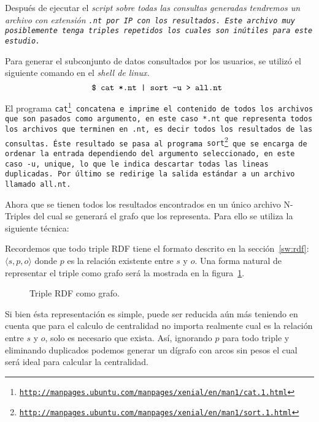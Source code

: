 Después de ejecutar el \it{script} sobre todas las consultas generadas tendremos
un archivo con extensión \tt{.nt} por IP con los resultados.
Este archivo muy posiblemente tenga triples repetidos los cuales son inútiles
para este estudio.

Para generar el subconjunto de datos consultados por los usuarios, se utilizó el
siguiente comando en el \it{shell} de \it{linux}.
$$\tt{\$ cat *.nt | sort -u > all.nt }$$

El programa \tt{cat}\footnote{
  \url{http://manpages.ubuntu.com/manpages/xenial/en/man1/cat.1.html}} 
concatena e imprime el contenido de todos los archivos que
son pasados como argumento, en este caso \tt{*.nt} que representa todos los
archivos que terminen en \tt{.nt}, es decir todos los resultados de las
consultas.
Éste resultado se pasa al programa \tt{sort}\footnote{
  \url{http://manpages.ubuntu.com/manpages/xenial/en/man1/sort.1.html}}
que se encarga de ordenar la entrada dependiendo del argumento seleccionado, en
este caso \tt{-u}, \tt{unique}, lo que le indica descartar todas las lineas
duplicadas. Por último se redirige la salida estándar a un archivo llamado
\tt{all.nt}.

Ahora que se tienen todos los resultados encontrados en un único archivo
N-Triples del cual se generará el grafo que los representa.
Para ello se utiliza la siguiente técnica:

Recordemos que todo triple RDF tiene el formato descrito en la
sección~\ref{sw:rdf}: $\langle s,p,o\rangle$
donde $p$ es la relación existente entre $s$ y $o$. Una forma natural de
representar el triple como grafo será la mostrada en la
figura~\ref{fig:rdfgraphsimple}.

\begin{figure}[htpb]
  \centering
  \caption{Triple RDF como grafo.}
  \label{fig:rdfgraphsimple}
\end{figure}

Si bien ésta representación es simple, puede ser reducida aún más teniendo en
cuenta que para el calculo de centralidad no importa realmente cual es la
relación entre $s$ y $o$, solo es necesario que exista. Así, ignorando $p$ para
todo triple y eliminando duplicados podemos generar un dígrafo con arcos sin
pesos el cual será ideal para calcular la centralidad.

